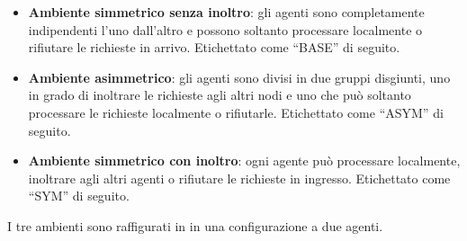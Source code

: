 \begin{itemize}
    \item \textbf{Ambiente simmetrico senza inoltro}: gli agenti sono completamente indipendenti l'uno dall'altro e possono soltanto processare localmente o rifiutare le richieste in arrivo. Etichettato come ``BASE'' di seguito.

    \item \textbf{Ambiente asimmetrico}: gli agenti sono divisi in due gruppi disgiunti, uno in grado di inoltrare le richieste agli altri nodi e uno che può soltanto processare le richieste localmente o rifiutarle. Etichettato come ``ASYM'' di seguito.

    \item \textbf{Ambiente simmetrico con inoltro}: ogni agente può processare localmente, inoltrare agli altri agenti o rifiutare le richieste in ingresso. Etichettato come ``SYM'' di seguito.
\end{itemize}

I tre ambienti sono raffigurati in  in una configurazione a due agenti.

